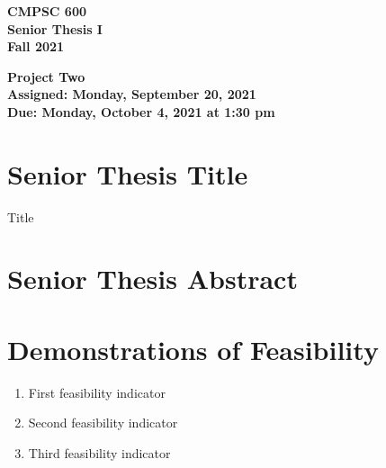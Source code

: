 \documentclass[11pt]{article}
\newcommand{\assignmentduedate}{October 4}
\newcommand{\assignmentassignedate}{September 20}
\newcommand{\assignmentnumber}{Two}
\newcommand{\labyear}{2021}
\newcommand{\labday}{Monday}
\newcommand{\labtime}{1:30 pm}
\newcommand{\assigneddate}{Assigned: \labday, \assignmentassignedate, \labyear{}}
\newcommand{\duedate}{Due: \labday, \assignmentduedate, \labyear{} at \labtime{}}
\newcommand{\projecttitle}[1]
{
  \begin{center}
    \begin{center}
      \bf
      CMPSC 600\\Senior Thesis I\\
      Fall 2021\\
      \medskip
    \end{center}
    \bf
    #1
  \end{center}
}
\begin{document}
\thispagestyle{empty}

\projecttitle{Project \assignmentnumber{} \\ \assigneddate{} \\ \duedate{}}

\section*{Senior Thesis Title}

\noindent
Title

\section*{Senior Thesis Abstract}


\section*{Demonstrations of Feasibility}

\begin{enumerate}
  \item First feasibility indicator
  \item Second feasibility indicator
  \item Third feasibility indicator
\end{enumerate}
\end{document}
